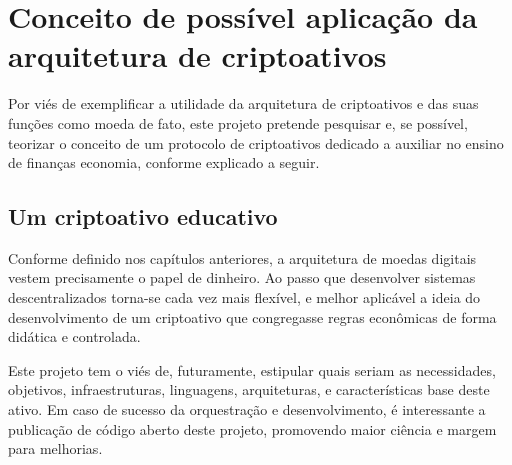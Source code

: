 \chapter{Conceito de possível aplicação da arquitetura de criptoativos}

Por viés de exemplificar a utilidade da arquitetura de criptoativos e das suas funções como moeda de fato, este projeto pretende pesquisar e, se possível, teorizar o conceito de um protocolo de criptoativos dedicado a auxiliar no ensino de finanças economia, conforme explicado a seguir.

\section*{Um criptoativo educativo}
\label{sec:educativo}

Conforme definido nos capítulos anteriores, a arquitetura de moedas digitais vestem precisamente o papel de dinheiro. Ao passo que desenvolver sistemas descentralizados torna-se cada vez mais flexível, e melhor aplicável a ideia do desenvolvimento de um criptoativo que congregasse regras econômicas de forma didática e controlada.

Este projeto tem o viés de, futuramente, estipular quais seriam as necessidades, objetivos, infraestruturas, linguagens, arquiteturas, e características base deste ativo. Em caso de sucesso da orquestração e desenvolvimento, é interessante a publicação de código aberto deste projeto, promovendo maior ciência e margem para melhorias.








